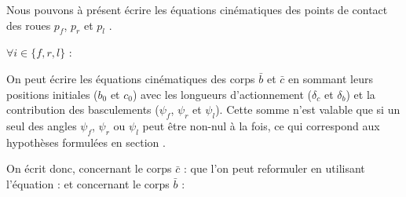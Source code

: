 					
					Nous pouvons à présent écrire les équations cinématiques des points de contact des roues $p_f$, $p_r$ et $p_l$ .
					
					$\forall i\in\{f,r,l\}$ :
					
					On peut écrire les équations cinématiques des corps $\bar{b}$ et $\bar{c}$ en sommant leurs positions initiales ($b_0$ et $c_0$) avec les longueurs d'actionnement ($\delta_c$ et $\delta_b$) et la contribution des basculements ($\psi_f$, $\psi_r$ et $\psi_l$).
					Cette somme n'est valable que si un seul des angles $\psi_f$, $\psi_r$ ou $\psi_l$ peut être non-nul à la fois, ce qui correspond aux hypothèses formulées en section . 
					
					On écrit donc, concernant le corps $\bar{c}$ :
					que l'on peut reformuler en utilisant l'équation  :
					et concernant le corps $\bar{b}$ :
					
